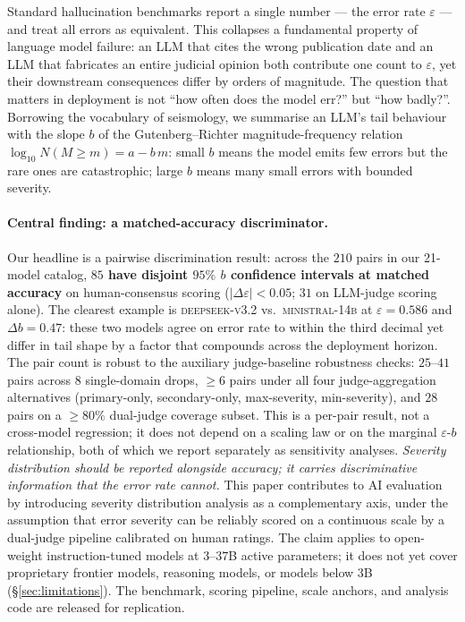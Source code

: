 \documentclass{article}
\newcommand{\sdi}{\ensuremath{b}}
\begin{document}
Standard hallucination benchmarks
\citep{lin2022truthfulqa,liu2023halueval} report a single number ---
the error rate $\varepsilon$ --- and treat all errors as equivalent.
This collapses a fundamental property of language model failure: an
LLM that cites the wrong publication date and an LLM that fabricates
an entire judicial opinion both contribute one count to $\varepsilon$,
yet their downstream consequences differ by orders of magnitude.
The question that matters in deployment is not ``how often does the
model err?'' but ``how badly?''. Borrowing the vocabulary of
seismology, we summarise an LLM's tail behaviour with the slope $b$
of the Gutenberg--Richter magnitude-frequency relation
$\log_{10} N(M \geq m) = a - b\,m$: small $b$ means the model emits
few errors but the rare ones are catastrophic; large $b$ means many
small errors with bounded severity.

\paragraph{Central finding: a matched-accuracy discriminator.}
Our headline is a pairwise discrimination result: across the $210$
pairs in our 21-model catalog, \textbf{$85$ have disjoint $95\%$
\sdi{} confidence intervals at matched accuracy} on human-consensus
scoring ($|\Delta\varepsilon| < 0.05$; $31$ on LLM-judge scoring
alone). The clearest example is \textsc{deepseek-v3.2} vs.\
\textsc{ministral-14b} at $\varepsilon = 0.586$ and
$\Delta\sdi = 0.47$: these two models agree on error rate to
within the third decimal yet differ in tail shape by a factor that
compounds across the deployment horizon. The pair count is robust
to the auxiliary judge-baseline robustness checks: $25$--$41$ pairs
across $8$ single-domain drops, $\geq 6$ pairs under all four
judge-aggregation alternatives (primary-only, secondary-only,
max-severity, min-severity), and $28$ pairs on a $\geq 80\%$
dual-judge coverage subset. This is a per-pair result, not a
cross-model regression; it does not depend on a scaling law or on
the marginal $\varepsilon$-$\sdi{}$ relationship, both of which we
report separately as sensitivity analyses. \emph{Severity
distribution should be reported alongside accuracy; it carries
discriminative information that the error rate cannot.} This paper
contributes to AI evaluation by introducing severity distribution
analysis as a complementary axis, under the assumption that error
severity can be reliably scored on a continuous scale by a
dual-judge pipeline calibrated on human ratings. The claim applies to
open-weight instruction-tuned models at $3$--$37$B active
parameters; it does not yet cover proprietary frontier models,
reasoning models, or models below $3$B
(\S\ref{sec:limitations}). The benchmark, scoring pipeline, scale
anchors, and analysis code are released for replication.
\end{document}
